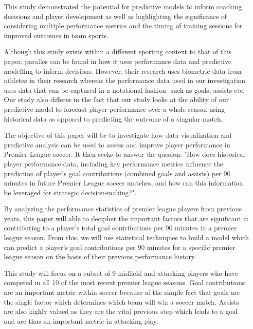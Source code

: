 \documentclass[12pt]{article}
\begin{document}
This study demonstrated the potential for predictive models to inform coaching
decisions and player development as well as highlighting the significance of
considering multiple performance metrics and the timing of training sessions for
improved outcomes in team sports.

Although this study exists within a different sporting context to that of this 
paper, paralles can be found in how it uses performance data and predictive
modelling to inform decisions. However, their research uses biometric data from 
athletes in their research whereas the performance data used in our investigation
uses data that can be captured in a notational fashion- such as goals, assists 
etc. Our study also differes in the fact that our study looks at the ability
of our predictive model to forecast player performance over a whole season using
historical data as opposed to predicting the outcome of a singular match.



The objective of this paper will be to investigate how data visualization and
predictive analysis can be used to assess and improve player performance in
Premier League soccer. It then seeks to answer the quesion:
"How does historical player performance data, including key performance
metrics influence the prediction of player's goal contributions
(combined goals and assists) per 90 minutes in future Premier League 
soccer matches, and how can this information be leveraged for strategic 
decision-making?".

By analyzing the performance statistics of premier league 
players from previous years, this paper will able to decipher the important
factors that are significant in contributing to a player's total goal
contributions per 90 minutes in a premier league season. From this, we will use 
statistical techniques to build a model which can predict a player's goal 
contributions per 90 minutes for a specific premier league season on the basis
of their previous performance history. 

This study will focus on a subset of 9 
midfield and attacking players who have competed in all 10 of the most recent 
premier league seasons. Goal contributions are an important metric within soccer
because of the simple fact that goals are the single factor which determines
which team will win a soccer match. Assists are also highly valued as they are
the vital previous step which leads to a goal and are thus an important metric
in attacking play.
\end{document}
